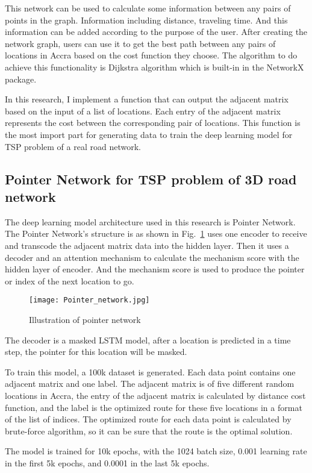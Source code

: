 \documentclass[final-report]{report-template}
\begin{document}
This network can be used to calculate some information between any pairs of points in the graph.
Information including distance, traveling time. And this information can be added according to the purpose of the user.
After creating the network graph, users can use it to get the best path between any pairs of locations in Accra based on the cost function they choose.
The algorithm to do achieve this functionality is Dijkstra algorithm which is built-in in the NetworkX package.

In this research, I implement a function that can output the adjacent matrix based on the input of a list of locations.
Each entry of the adjacent matrix represents the cost between the corresponding pair of locations. 
This function is the most import part for generating data to train the deep learning model for TSP problem of a real road network.

\subsection {Pointer Network for TSP problem of 3D road network}
The deep learning model architecture used in this research is Pointer Network\cite{vinyals2017pointer}.
The Pointer Network's structure is as shown in Fig.~\ref{fig:pointernet} uses one encoder to receive and transcode the adjacent matrix data into the hidden layer.
Then it uses a decoder and an attention mechanism to calculate the mechanism score with the hidden layer of encoder.
And the mechanism score is used to produce the pointer or index of the next location to go.
\begin{figure}[H]
    \centering
    \texttt{[image: Pointer\_network.jpg]}
    \caption{\label{fig:pointernet}Illustration of pointer network}
\end{figure}
The decoder is a masked LSTM model, after a location is predicted in a time step, the pointer for this location will be masked.

To train this model, a 100k dataset is generated. Each data point contains one adjacent matrix and one label.
The adjacent matrix is of five different random locations in Accra, the entry of the adjacent matrix is calculated by distance cost function,
and the label is the optimized route for these five locations in a format of the list of indices.
The optimized route for each data point is calculated by brute-force algorithm, so it can be sure that the route is the optimal solution.

The model is trained for 10k epochs, with the 1024 batch size, 0.001 learning rate in the first 5k epochs, and 0.0001 in the last 5k epochs.
\end{document}
